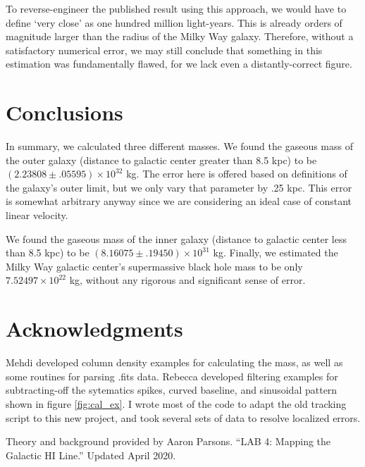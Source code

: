 \documentclass[12pt]{article}
\begin{document}
To reverse-engineer the published result using this approach, we would have to define `very close' as one hundred million light-years. This is already orders of magnitude larger than the radius of the Milky Way galaxy. Therefore, without a satisfactory numerical error, we may still conclude that something in this estimation was fundamentally flawed, for we lack even a distantly-correct figure.

\section{Conclusions}

\quad \quad In summary, we calculated three different masses. We found the gaseous mass of the outer galaxy (distance to galactic center greater than 8.5 kpc) to be $(2.23808 \pm .05595) \times 10^{32}$ kg. The error here is offered based on definitions of the galaxy's outer limit, but we only vary that parameter by .25 kpc. This error is somewhat arbitrary anyway since we are considering an ideal case of constant linear velocity.

We found the gaseous mass of the inner galaxy (distance to galactic center less than 8.5 kpc) to be $(8.16075 \pm .19450) \times 10^{31}$ kg. Finally, we estimated the Milky Way galactic center's supermassive black hole mass to be only $7.52497 \times 10^{22}$ kg, without any rigorous and significant sense of error.

\section{Acknowledgments}

\quad \quad Mehdi developed column density examples for calculating the mass, as well as some routines for parsing .fits data. Rebecca developed filtering examples for subtracting-off the sytematics spikes, curved baseline, and sinusoidal pattern shown in figure \ref{fig:cal_ex}. I wrote most of the code to adapt the old tracking script to this new project, and took several sets of data to resolve localized errors.

Theory and background provided by Aaron Parsons. ``LAB 4: Mapping the Galactic HI Line.'' Updated April 2020.

\end{document}
